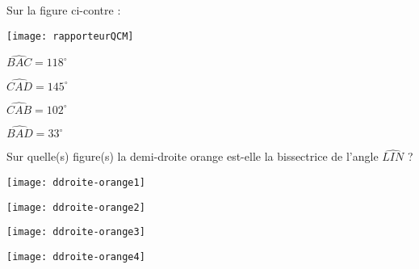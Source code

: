 \begin{QCM}
\begin{GroupeQCM}
    
     \begin{exercice}
     Sur la figure ci-contre : \vspace{-2em}\begin{center}\texttt{[image: rapporteurQCM]}\end{center}\vspace{-1em}
      \begin{ChoixQCM}{4}
      \item $\widehat{BAC} = 118^\circ$
      \item $\widehat{CAD} = 145^\circ$
      \item $\widehat{CAB} = 102^\circ$
      \item $\widehat{BAD} = 33^\circ$
      \end{ChoixQCM}
\begin{corrige}
   \end{corrige}
    \end{exercice}
    
    
    \begin{exercice}
     Sur quelle(s) figure(s) la demi-droite orange est-elle la bissectrice de l'angle $\widehat{LIN}$ ?
      \begin{ChoixQCM}{4}
      \item \texttt{[image: ddroite-orange1]}
      \item \texttt{[image: ddroite-orange2]}
      \item \texttt{[image: ddroite-orange3]}
      \item \texttt{[image: ddroite-orange4]}
      \end{ChoixQCM}
\begin{corrige}
   \end{corrige}
    \end{exercice}
\end{GroupeQCM}
\end{QCM}

  
